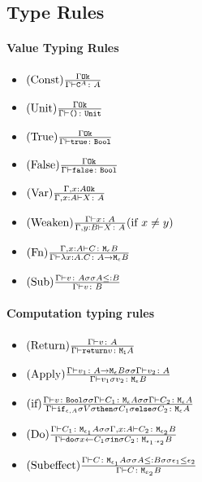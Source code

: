 {    \subsection{Type Rules}
    \paragraph{Value Typing Rules}
    \begin{itemize}
        \item $\truleconst$
        \item $\truleunit$
        \item $\truletrue$
        \item $\trulefalse$
        \item $\treerule{Var}{\ok{\gax}}{\typerelation{\gax}{X}{A}}$
        \item $\condtreerule{Weaken}{\typerelation{\G}{x}{A}}{\typerelation{\gby}{X}{A}}{x \neq y}$
        \item $\treerule{Fn}{\typerelation{\gax}{C}{\meb}}{\typerelation{\G}{\lam{x}{A}{C}}{\lamtype{A}{\e}{B}}}$
        \item $\treerule{Sub}{\typerelation{\G}{v}{A}\s\s A \subtype B}{\typerelation{\G}{v}{B}}$
    \end{itemize}
    \paragraph{Computation typing rules}
    \begin{itemize}
        \item $\treerule{Return}{\typerelation{\G}{v}{A}}{\typerelation{\G}{\return{v}}{\moa}}$
        \item $\treerule{Apply}{\typerelation{\G}{v_1}{\lamtype{A}{\e}{B}}\s\s\typerelation{\G}{v_2}{A}}{\typerelation{\G}{\apply{v_1}{v_2}}{\meb}}$
        \item $\treerule{if}{\typerelation{\G}{v}{\B} \s\s \typerelation{\G}{C_1}{\mea}\s\s\typerelation{\G}{C_2}{\mea}}{\typerelation{\G}{\ifthenelse{\e}{A}{V}{C_1}{C_2}}{\mea}}$
        \item $\treerule{Do}{\typerelation{\G}{C_1}{\M{\e_1}{A}} \s\s \typerelation{\gax}{C_2}{\M{\e_2}{B}}}{\typerelation{\G}{\doin{x}{C_1}{C_2}}{\M{\e_1 \dot \e_2}{B}}}$
        \item $\treerule{Subeffect}{\typerelation{\G}{C}{\M{\e_1}{A}}\s\s A \subtype B \s\s \e_1 \subeffect \e_2}{\typerelation{\G}{C}{\M{e_2}{B}}}$
    \end{itemize}

}
